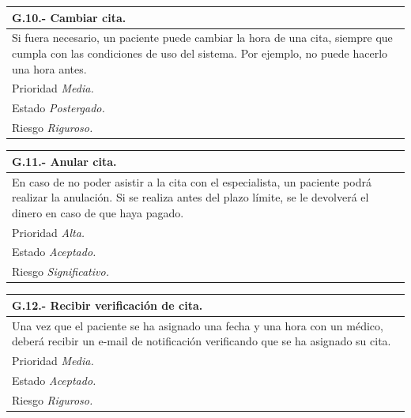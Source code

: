 \documentclass[a4paper,oneside,11pt]{book}
\begin{document}
\begin{center}
\begin{tabulary}{15cm}{|L|}
	\hline
		\bf{G.10.- Cambiar cita.} \\
	\hline
		Si fuera necesario, un paciente puede cambiar la hora de una cita, siempre que cumpla con las condiciones de uso del sistema. Por ejemplo, no puede hacerlo una hora antes. \\
	\hline
		Prioridad \textit{Media.} \\
	\hline
		Estado \textit{Postergado.} \\
	\hline
		Riesgo \textit{Riguroso.} \\
	\hline
\end{tabulary}
\end{center}

\begin{center}
\begin{tabulary}{15cm}{|L|}
	\hline
		\bf{G.11.- Anular cita.} \\
	\hline
		En caso de no poder asistir a la cita con el especialista, un paciente podrá realizar la anulación. Si se realiza antes del plazo límite, se le devolverá el dinero en caso de que haya pagado. \\
	\hline
		Prioridad \textit{Alta.} \\
	\hline
		Estado \textit{Aceptado.} \\
	\hline
		Riesgo \textit{Significativo.} \\
	\hline
\end{tabulary}
\end{center}

\begin{center}
\begin{tabulary}{15cm}{|L|}
	\hline
		\bf{G.12.- Recibir verificación de cita.} \\
	\hline
		Una vez que el paciente se ha asignado una fecha y una hora con un médico, deberá recibir un e-mail de notificación verificando que se ha asignado su cita. \\
	\hline
		Prioridad \textit{Media.} \\
	\hline
		Estado \textit{Aceptado.} \\
	\hline
		Riesgo \textit{Riguroso.} \\
	\hline
\end{tabulary}
\end{center}
\end{document}
